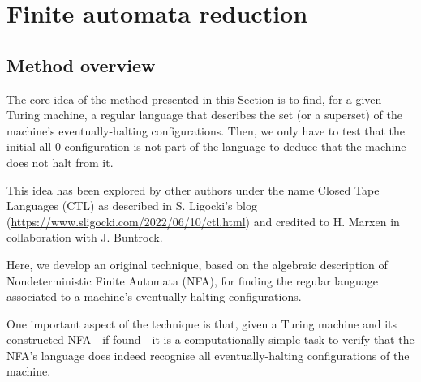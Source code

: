 \section{Finite automata reduction}\label{sec:finite-automata-reduction}

\subsection{Method overview}

The core idea of the method presented in this Section is to find, for a given Turing machine, a regular language that describes the set (or a superset) of the machine's eventually-halting configurations. Then, we only have to test that the initial all-0 configuration is not part of the language to deduce that the machine does not halt from it.

This idea has been explored by other authors under the name Closed Tape Languages (CTL) as described in S. Ligocki's blog (\url{https://www.sligocki.com/2022/06/10/ctl.html}) and credited to H. Marxen in collaboration with J. Buntrock.

Here, we develop an original technique, based on the algebraic description of Nondeterministic Finite Automata (NFA), for finding the regular language associated to a machine's eventually halting configurations.

One important aspect of the technique is that, given a Turing machine and its constructed NFA---if found---it is a computationally simple task to verify that the NFA's language does indeed recognise all eventually-halting configurations of the machine.


\usetikzlibrary {automata, positioning}

